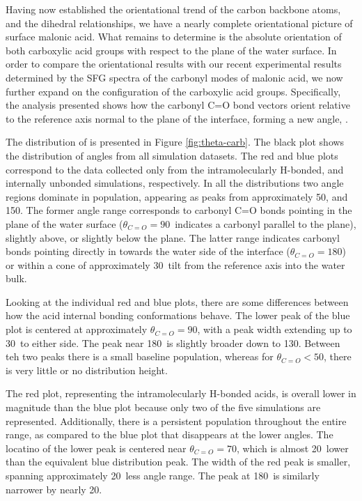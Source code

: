 Having now established the \thetaphi orientational trend of the carbon backbone atoms, and the \psipsi dihedral relationships, we have a nearly complete orientational picture of surface malonic acid. What remains to determine is the absolute orientation of both carboxylic acid groups with respect to the plane of the water surface. In order to compare the orientational results with our recent experimental results determined by the SFG spectra of the carbonyl modes of malonic acid,\cite{Blower2012} we now further expand on the configuration of the carboxylic acid groups. Specifically, the analysis presented shows how the carbonyl C=O bond vectors orient relative to the reference axis normal to the plane of the interface, forming a new angle, \thetacarb.

The distribution of \thetacarb is presented in Figure \ref{fig:theta-carb}. The black plot shows the distribution of angles from all simulation datasets. The red and blue plots correspond to the \thetacarb data collected only from the intramolecularly H-bonded, and internally unbonded simulations, respectively. In all the distributions two angle regions dominate in population, appearing as peaks from approximately 50\degr, and 150\degr. The former angle range corresponds to carbonyl C=O bonds pointing in the plane of the water surface ($\theta_{C=O}=90$\degr~indicates a carbonyl parallel to the plane), slightly above, or slightly below the plane. The latter range indicates carbonyl bonds pointing directly in towards the water side of the interface ($\theta_{C=O}=180$\degr) or within a cone of approximately 30\degr~tilt from the reference axis into the water bulk.

Looking at the individual red and blue plots, there are some differences between how the acid internal bonding conformations behave. The lower peak of the blue plot is centered at approximately $\theta_{C=O}=90$\degr, with a peak width extending up to 30\degr~to either side. The peak near 180\degr~is slightly broader down to 130\degr. Between teh two peaks there is a small baseline population, whereas for $\theta_{C=O} < 50$\degr, there is very little or no distribution height.

The red plot, representing the intramolecularly H-bonded acids, is overall lower in magnitude than the blue plot because only two of the five simulations are represented. Additionally, there is a persistent population throughout the entire \thetacarb range, as compared to the blue plot that disappears at the lower angles. The locatino of the lower peak is centered near $\theta_{C=O}=70$\degr, which is almost 20\degr~lower than the equivalent blue distribution peak. The width of the red peak is smaller, spanning approximately 20\degr~less angle range. The peak at 180\degr~is similarly narrower by nearly 20\degr.

